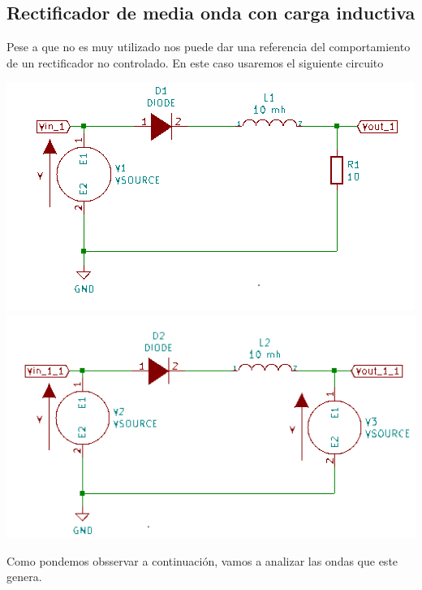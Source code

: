 \documentclass[12pt,a4paper]{article}
\begin{document}
\subsection{Rectificador de media onda con carga inductiva}
Pese a que no es muy utilizado nos puede dar una referencia del comportamiento de un rectificador no controlado. En este caso usaremos el siguiente circuito
\\
\begin{center}
\includegraphics[scale=1]{imagenes/p1/C1.png} 
\includegraphics[scale=1]{imagenes/p1/C11.png} 
\end{center}
\begin{flushleft}
Como pondemos obsservar a continuación, vamos a analizar las ondas que este genera. 
\end{flushleft}
\end{document}
